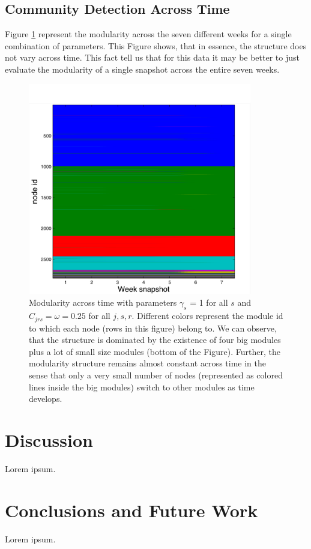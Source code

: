 \documentclass[12pt]{article}
\begin{document}
\subsection{Community Detection Across Time}

Figure \ref{fig.time.modular} represent the modularity across the
seven different weeks for a single combination of parameters. This Figure shows, that in essence, the
structure does not vary across time. This fact tell us that
for this data it may be better to just evaluate the modularity
of a single snapshot across the entire seven weeks. 

\begin{figure}[!ht]
	\centering
	\includegraphics[width=0.87\textwidth]{Figures/modularity_time}
	\caption{Modularity across time with parameters
		$\gamma_s$ = 1 for all $s$ and $C_{jrs} = \omega=0.25$ for
		all $j,s,r$.
		 Different colors represent
		the module id to which each node (rows in this figure)
		belong to. We can observe, that the structure is dominated
		by the existence of four big modules plus a lot of small
		size modules (bottom of the Figure). Further, the modularity
		structure remains almost constant across time in the sense
		that only a very small number of nodes (represented as colored
		lines inside the big modules) switch to other modules as
		time develops.}
	\label{fig.time.modular}
\end{figure}

\section{Discussion}

Lorem ipsum.

\section{Conclusions and Future Work}

Lorem ipsum.



\end{document}
